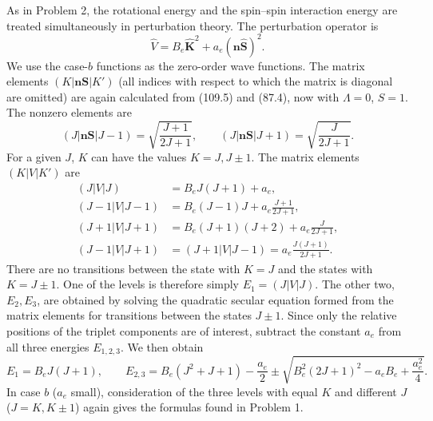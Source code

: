 \SolutionHeading As in Problem 2, the rotational energy and the spin--spin interaction energy are treated simultaneously in perturbation theory. The perturbation operator is
\[
 \widehat V=B_e\widehat{\mathbf K}^{2}+a_e(\mathbf n\widehat{\mathbf S})^2.
\]
We use the case-$b$ functions as the zero-order wave functions. The matrix elements $(K|\mathbf n\mathbf S|K')$ (all indices with respect to which the matrix is diagonal are omitted) are again calculated from (109.5) and (87.4), now with $\Lambda=0$, $S=1$. The nonzero elements are
\[
 (J|\mathbf n\mathbf S|J-1)=\sqrt{\frac{J+1}{2J+1}},\qquad
 (J|\mathbf n\mathbf S|J+1)=\sqrt{\frac{J}{2J+1}}.
\]
For a given $J$, $K$ can have the values $K=J,J\pm1$. The matrix elements $(K|V|K')$ are
\begin{align*}
 (J|V|J)&=B_eJ(J+1)+a_e,\\
 (J-1|V|J-1)&=B_e(J-1)J+a_e\frac{J+1}{2J+1},\\
 (J+1|V|J+1)&=B_e(J+1)(J+2)+a_e\frac{J}{2J+1},\\
 (J-1|V|J+1)&=(J+1|V|J-1)=a_e\frac{J(J+1)}{2J+1}.
\end{align*}
There are no transitions between the state with $K=J$ and the states with $K=J\pm1$. One of the levels is therefore simply $E_1=(J|V|J)$. The other two, $E_2,E_3$, are obtained by solving the quadratic secular equation formed from the matrix elements for transitions between the states $J\pm1$. Since only the relative positions of the triplet components are of interest, subtract the constant $a_e$ from all three energies $E_{1,2,3}$. We then obtain
\[
 E_1=B_eJ(J+1),\qquad
 E_{2,3}=B_e(J^2+J+1)-\frac{a_e}{2}
 \pm\sqrt{B_e^2(2J+1)^2-a_eB_e+\frac{a_e^2}{4}}.
\]
In case $b$ ($a_e$ small), consideration of the three levels with equal $K$ and different $J$ ($J=K,K\pm1$) again gives the formulas found in Problem 1.
